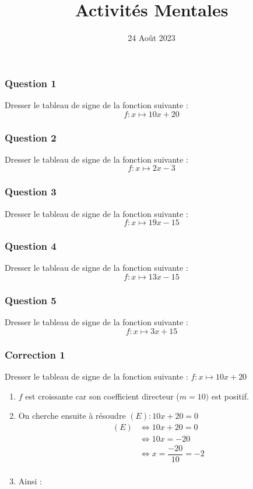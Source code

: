 \documentclass[15pt, mathserif]{beamer}
\title{Activités Mentales}
\date{24 Août 2023}
\begin{document}
\begin{frame}
    \titlepage
\end{frame}

\begin{frame} 
	\frametitle{Question 1}
Dresser le tableau de signe de la fonction suivante : $$ f:x\mapsto10x+20$$\end{frame}


\begin{frame} 
	\frametitle{Question 2}
Dresser le tableau de signe de la fonction suivante : $$ f:x\mapsto2x-3$$\end{frame}


\begin{frame} 
	\frametitle{Question 3}
Dresser le tableau de signe de la fonction suivante : $$ f:x\mapsto19x-15$$\end{frame}


\begin{frame} 
	\frametitle{Question 4}
Dresser le tableau de signe de la fonction suivante : $$ f:x\mapsto13x-15$$\end{frame}


\begin{frame} 
	\frametitle{Question 5}
Dresser le tableau de signe de la fonction suivante : $$ f:x\mapsto3x+15$$\end{frame}


\begin{frame}
\vspace{-10mm}
	\frametitle{Correction 1}
\vspace*{1cm} 
 \footnotesize{Dresser le tableau de signe de la fonction suivante : $ f:x\mapsto10x+20$} 
 \begin{enumerate} 
 \item $f$ est croissante car son coefficient directeur ($m=10)$ est positif.
 \item On cherche ensuite à résoudre  $(E) : 10x+20=0 $	 
 \begin{align*} (E)& \Leftrightarrow 10x+20=0\\
		 	 & \Leftrightarrow 10x=-20\\
			 & \Leftrightarrow x= \dfrac{-20}{10}=-2\\
	 \end{align*} 
 \item Ainsi : \\ 
 \end{enumerate} 
 \end{frame}
\end{document}
